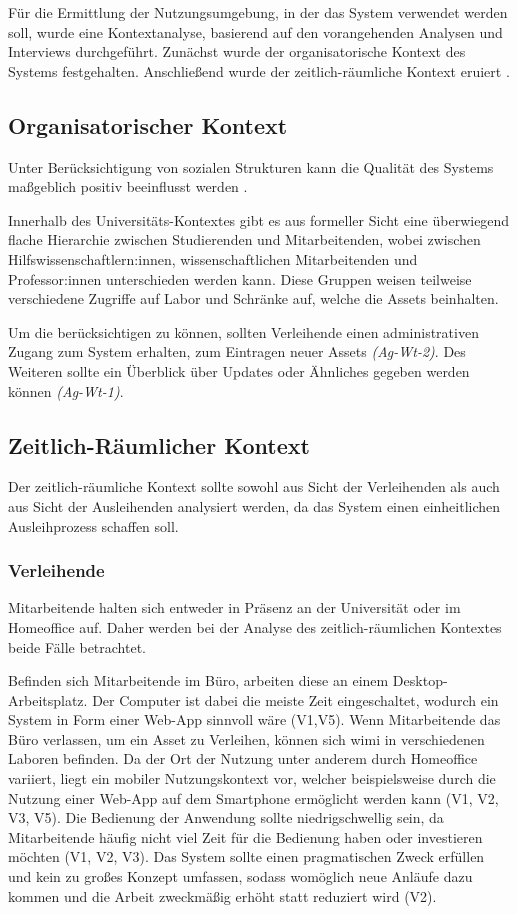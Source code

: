 Für die Ermittlung der Nutzungsumgebung, in der das System verwendet werden soll, wurde eine
Kontextanalyse, basierend auf den vorangehenden Analysen und Interviews durchgeführt. Zunächst wurde
der organisatorische Kontext des Systems festgehalten. Anschließend wurde der zeitlich-räumliche
Kontext eruiert \cite{herczeg_software-ergonomie_2018}.

\subsection{Organisatorischer Kontext}
Unter Berücksichtigung von sozialen Strukturen kann die Qualität des Systems maßgeblich positiv
beeinflusst werden \cite{herczeg_software-ergonomie_2018}.

Innerhalb des Universitäts-Kontextes gibt es aus formeller Sicht eine überwiegend flache Hierarchie
zwischen Studierenden und Mitarbeitenden, wobei zwischen Hilfswissenschaftlern:innen,
wissenschaftlichen Mitarbeitenden und Professor:innen unterschieden werden kann. Diese Gruppen
weisen teilweise verschiedene Zugriffe auf Labor und Schränke auf, welche die Assets beinhalten.

Um die  berücksichtigen zu können, sollten Verleihende einen administrativen
Zugang zum System erhalten, zum Eintragen neuer Assets \textit{(Ag-Wt-2)}. Des Weiteren sollte ein
Überblick über Updates oder Ähnliches  gegeben werden können \textit{(Ag-Wt-1)}.


\subsection{Zeitlich-Räumlicher Kontext}
\label{section:zeit}
Der zeitlich-räumliche Kontext sollte sowohl aus Sicht der Verleihenden als auch aus Sicht der
Ausleihenden analysiert werden, da das System einen einheitlichen Ausleihprozess schaffen soll.

\subsubsection{Verleihende}
Mitarbeitende halten sich entweder in Präsenz an der Universität oder im Homeoffice auf. Daher
werden bei der Analyse des zeitlich-räumlichen Kontextes beide Fälle betrachtet.

Befinden sich Mitarbeitende im Büro, arbeiten diese an einem Desktop-Arbeitsplatz. Der Computer ist
dabei die meiste Zeit eingeschaltet, wodurch ein System in Form einer Web-App sinnvoll wäre (V1,V5).
Wenn Mitarbeitende das Büro verlassen, um ein Asset zu Verleihen, können sich \ac{wimi} in
verschiedenen Laboren befinden. Da der Ort der Nutzung unter anderem durch Homeoffice variiert,
liegt ein mobiler Nutzungskontext vor, welcher beispielsweise durch die Nutzung einer Web-App auf
dem Smartphone ermöglicht werden kann (V1, V2, V3, V5). Die Bedienung der Anwendung sollte
niedrigschwellig sein, da Mitarbeitende häufig nicht viel Zeit für die Bedienung haben oder
investieren möchten (V1, V2, V3). Das System sollte einen pragmatischen Zweck erfüllen und kein zu
großes Konzept umfassen, sodass womöglich neue Anläufe dazu kommen und die Arbeit zweckmäßig
erhöht statt reduziert wird (V2).


